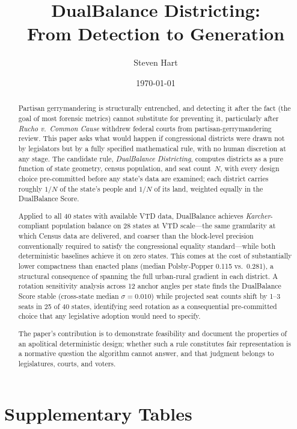 ﻿\documentclass[11pt]{article}
\title{DualBalance Districting:\\From Detection to Generation}
\author{Steven Hart}
\date{\today}
\begin{document}
\maketitle

\begin{abstract}
Partisan gerrymandering is structurally entrenched, and detecting it
after the fact (the goal of most forensic metrics) cannot substitute
for preventing it, particularly after \textit{Rucho v.~Common Cause}
withdrew federal courts from partisan-gerrymandering review. This
paper asks what would happen if congressional districts were drawn
not by legislators but by a fully specified mathematical rule, with
no human discretion at any stage. The candidate rule,
\emph{DualBalance Districting}, computes districts as a pure function
of state geometry, census population, and seat count~$N$, with every
design choice pre-committed before any state's data are examined;
each district carries roughly $1/N$ of the state's people and $1/N$
of its land, weighted equally in the DualBalance Score.

Applied to all 40 states with available VTD data,
DualBalance achieves \textit{Karcher}-compliant population balance on
28 states at VTD scale---the same granularity at which Census data are
delivered, and coarser than the block-level precision conventionally
required to satisfy the congressional equality standard---while both
deterministic baselines achieve it on zero states. This comes at the
cost of substantially lower compactness than enacted plans (median
Polsby-Popper 0.115 vs.\ 0.281), a structural consequence of
spanning the full urban-rural gradient in each district. A rotation
sensitivity analysis across 12 anchor angles per state finds the
DualBalance Score stable (cross-state median $\sigma = 0.010$) while
projected seat counts shift by 1--3 seats in 25 of 40 states,
identifying seed rotation as a consequential pre-committed choice
that any legislative adoption would need to specify.

The paper's contribution is to demonstrate feasibility and document
the properties of an apolitical deterministic design; whether such
a rule constitutes fair representation is a normative question the
algorithm cannot answer, and that judgment belongs to legislatures,
courts, and voters.
\end{abstract}






\clearpage
\appendix
\renewcommand{\thetable}{S\arabic{table}}
\setcounter{table}{0}
\section*{Supplementary Tables}





\end{document}
